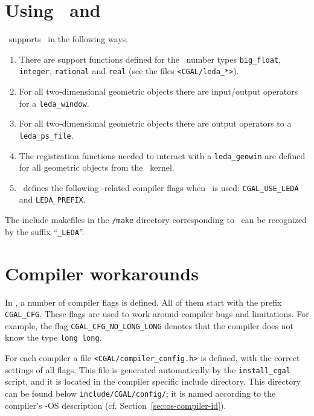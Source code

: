 
\section{Using \cgal\ and \leda}\label{sec:leda}
\cgal\ supports \leda\ in the following ways.

\begin{enumerate}
\item There are support functions defined for the \leda\ number types
  \texttt{big\_float}, \texttt{integer}, \texttt{rational} and
  \texttt{real} (see the files \texttt{<CGAL/leda\_*>}).
\item For all two-dimensional geometric objects there are input/output
  operators for a \texttt{leda\_window}.
\item For all two-dimensional geometric objects there are output
  operators to a \texttt{leda\_ps\_file}.
\item The registration functions needed to interact with a
  \texttt{leda\_geowin} are defined for all geometric objects from the
  \cgal\ kernel.
\item \cgal\ defines the following \leda-related compiler flags when
      \leda\ is used: \texttt{CGAL\_USE\_LEDA} and \texttt{LEDA\_PREFIX}.
\end{enumerate}

The include makefiles in the \texttt{\cgaldir/make} directory
corresponding to \leda\ can be recognized by the suffix
``\texttt{\_LEDA}''.

\section{Compiler workarounds}

In \cgal, a number of compiler flags is defined. All of them start
with the prefix \texttt{CGAL\_CFG}. These flags are used to work
around compiler bugs and limitations. For example, the flag
\texttt{CGAL\_CFG\_NO\_LONG\_LONG} denotes that the compiler does not
know the type \texttt{long long}.

For each compiler a file \texttt{<CGAL/compiler\_config.h>}
 is defined, with the correct
settings of all flags. This file is generated automatically by the
\texttt{install\_cgal} script, and it is located in the compiler
specific include directory. This directory can be found below
\texttt{include/CGAL/config/};
 it is named according to the compiler's \cgal-OS
description (cf. Section~\ref{sec:os-compiler-id}).

